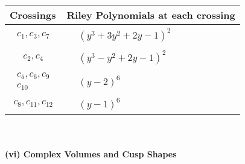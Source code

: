 \documentclass[1p]{elsarticle_modified}
\theoremstyle{definition}
\begin{document}
\begin{tabular}{m{50pt}|m{274pt}}
Crossings & \hspace{64pt}Riley Polynomials at each crossing \\
\hline $$\begin{aligned}c_{1},c_{3},c_{7}\end{aligned}$$&$\begin{aligned}
&(y^3+3 y^2+2 y-1)^2
\end{aligned}$\\
\hline $$\begin{aligned}c_{2},c_{4}\end{aligned}$$&$\begin{aligned}
&(y^3- y^2+2 y-1)^2
\end{aligned}$\\
\hline $$\begin{aligned}c_{5},c_{6},c_{9}\\c_{10}\end{aligned}$$&$\begin{aligned}
&(y-2)^6
\end{aligned}$\\
\hline $$\begin{aligned}c_{8},c_{11},c_{12}\end{aligned}$$&$\begin{aligned}
&(y-1)^6
\end{aligned}$\\
\hline
\end{tabular}\\~\\
\newpage\flushleft \textbf{(vi) Complex Volumes and Cusp Shapes}
\end{document}
